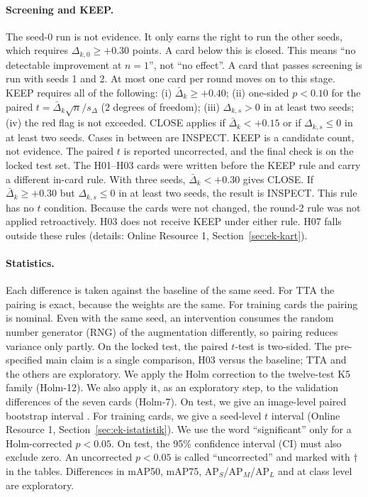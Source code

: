 \documentclass[pdflatex,iicol,sn-mathphys-num]{sn-jnl}
\begin{document}
\paragraph{Screening and KEEP.}
The seed-0 run is not evidence. It only earns the right to run the other seeds, which requires $\Delta_{k,0}\ge+0.30$ points. A card below this is closed. This means ``no detectable improvement at $n=1$'', not ``no effect''. A card that passes screening is run with seeds 1 and 2. At most one card per round moves on to this stage. KEEP requires all of the following:
(i) $\bar\Delta_k\ge+0.40$;
(ii) one-sided $p<0.10$ for the paired $t=\bar\Delta_k\sqrt n/s_\Delta$ (2 degrees of freedom);
(iii) $\Delta_{k,s}>0$ in at least two seeds;
(iv) the red flag is not exceeded.
CLOSE applies if $\bar\Delta_k<+0.15$ or if $\Delta_{k,s}\le0$ in at least two seeds. Cases in between are INSPECT. KEEP is a candidate count, not evidence. The paired $t$ is reported uncorrected, and the final check is on the locked test set. The H01--H03 cards were written before the KEEP rule and carry a different in-card rule. With three seeds, $\bar\Delta_k<+0.30$ gives CLOSE. If $\bar\Delta_k\ge+0.30$ but $\Delta_{k,s}\le0$ in at least two seeds, the result is INSPECT. This rule has no $t$ condition. Because the cards were not changed, the round-2 rule was not applied retroactively. H03 does not receive KEEP under either rule. H07 falls outside these rules (details: Online Resource 1, Section~\ref{sec:ek-kart}).

\paragraph{Statistics.}
Each difference is taken against the baseline of the same seed. For TTA the pairing is exact, because the weights are the same. For training cards the pairing is nominal. Even with the same seed, an intervention consumes the random number generator (RNG) of the augmentation differently, so pairing reduces variance only partly. On the locked test, the paired $t$-test is two-sided. The pre-specified main claim is a single comparison, H03 versus the baseline; TTA and the others are exploratory. We apply the Holm correction \cite{holm_1979_sequential} to the twelve-test K5 family (Holm-12). We also apply it, as an exploratory step, to the validation differences of the seven cards (Holm-7). On test, we give an image-level paired bootstrap interval \cite{efron_1979_bootstrap}. For training cards, we give a seed-level $t$ interval (Online Resource 1, Section~\ref{sec:ek-istatistik}). We use the word ``significant'' only for a Holm-corrected $p<0.05$. On test, the 95\% confidence interval (CI) must also exclude zero. An uncorrected $p<0.05$ is called ``uncorrected'' and marked with $\dagger$ in the tables. Differences in mAP50, mAP75, AP$_S$/AP$_M$/AP$_L$ and at class level are exploratory.
\end{document}
